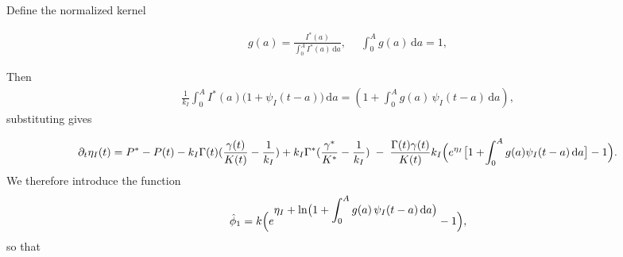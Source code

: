 \documentclass[10pt, a4paper]{amsart}
\theoremstyle{plain}
\theoremstyle{definition}
\theoremstyle{remark}
\numberwithin{equation}{section}
\begin{document}
Define the normalized kernel

\begin{align}\label{e3.81}
g(a)
=\frac{I^{*}(a)}
{\displaystyle\int_{0}^{A}I^{*}(a)\,\mathrm{d}a},\; %
\quad
\int_{0}^{A}g(a)\,\mathrm{d}a=1,%
\end{align}

Then
\begin{align}\label{e3.82}
    \frac{1}{k_I}\int_{0}^{A}I^{*}(a)\bigl(1+\psi_{I}(t-a)\bigr)\,\mathrm{d}a
=(1+\int_{0}^{A}g(a)\,\psi_{I}(t-a)\,\mathrm{d}a),
\end{align}
substituting gives

\begin{align}\label{e3.83}
    \partial_{t}\eta_{I}(t)
= P^*-P(t)-k_I\Gamma(t)(\frac{\gamma(t)}{K(t)}-\frac{1}{k_I})+k_I\Gamma^*(\frac{\gamma^*}{K^*}-\frac{1}{k_I})
\;-\;\frac{\Gamma(t)\gamma(t)}{K(t)}k_I\Bigl(e^{\eta_{I}}
\bigl[1+\!\int_{0}^{A}g(a)\psi_{I}(t-a)\,\mathrm{d}a\bigr]
-1\Bigr).
\end{align}
We therefore introduce the function
\begin{align}\label{e3.84}
\hat{\phi}_1= k\Bigl(
e^{\displaystyle\eta_{I}+\displaystyle\ln\bigl(1+\displaystyle\int_{0}^{A}g(a)\,\psi_{I}(t-a)\,\mathrm{d}a\bigr)}
-1\Bigr),
\end{align}
so that
\end{document}
